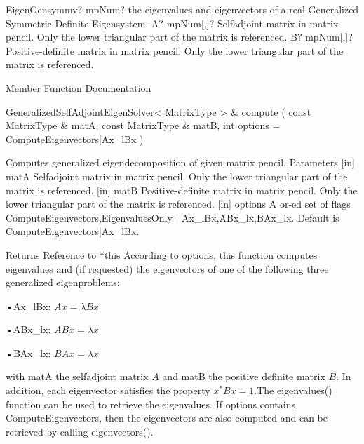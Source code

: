 \vspace{0.6cm}
\begin{mpFunctionsExtract}
	\mpFunctionTwo
	{EigenGensymmv? mpNum? the eigenvalues and eigenvectors of a real Generalized Symmetric-Definite Eigensystem.}
	{A? mpNum[,]? Selfadjoint matrix in matrix pencil. Only the lower triangular part of the matrix is referenced.}
	{B? mpNum[,]? Positive-definite matrix in matrix pencil. Only the lower triangular part of the matrix is referenced.}
\end{mpFunctionsExtract}


%

\vspace{0.3cm}
Member Function Documentation

GeneralizedSelfAdjointEigenSolver< MatrixType > \& compute  ( const MatrixType \&  matA, const MatrixType \&  matB,  int  options = ComputeEigenvectors|Ax\_lBx )   

Computes generalized eigendecomposition of given matrix pencil. 
Parameters
[in] matA Selfadjoint matrix in matrix pencil. Only the lower triangular part of the matrix is referenced.  
[in] matB Positive-definite matrix in matrix pencil. Only the lower triangular part of the matrix is referenced.  
[in] options A or-ed set of flags {ComputeEigenvectors,EigenvaluesOnly} | {Ax\_lBx,ABx\_lx,BAx\_lx}. Default is ComputeEigenvectors|Ax\_lBx. 

Returns
Reference to *this 
According to options, this function computes eigenvalues and (if requested) the eigenvectors of one of the following three generalized eigenproblems:

•Ax\_lBx: $Ax=\lambda Bx$

•ABx\_lx: $A B x = \lambda x$

•BAx\_lx:  $B A x = \lambda x$ 

with matA the selfadjoint matrix $A$ and matB the positive definite matrix $B$. In addition, each eigenvector  satisfies the property $x^* B x=1$.The eigenvalues() function can be used to retrieve the eigenvalues. If options contains ComputeEigenvectors, then the eigenvectors are also computed and can be retrieved by calling eigenvectors().

